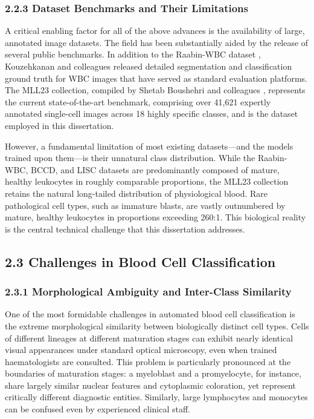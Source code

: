 \documentclass[11pt]{article}
\begin{document}
\subsubsection*{2.2.3 Dataset Benchmarks and Their Limitations}

A critical enabling factor for all of the above advances is the availability of large, annotated image datasets. The field has been substantially aided by the release of several public benchmarks. In addition to the Raabin-WBC dataset \cite{rahimzadeh2021}, Kouzehkanan and colleagues \cite{kouzehkanan2021} released detailed segmentation and classification ground truth for WBC images that have served as standard evaluation platforms. The MLL23 collection, compiled by Shetab Boushehri and colleagues \cite{mll23}, represents the current state-of-the-art benchmark, comprising over 41,621 expertly annotated single-cell images across 18 highly specific classes, and is the dataset employed in this dissertation.

However, a fundamental limitation of most existing datasets—and the models trained upon them—is their unnatural class distribution. While the Raabin-WBC, BCCD, and LISC datasets are predominantly composed of mature, healthy leukocytes in roughly comparable proportions, the MLL23 collection retains the natural long-tailed distribution of physiological blood. Rare pathological cell types, such as immature blasts, are vastly outnumbered by mature, healthy leukocytes in proportions exceeding 260:1. This biological reality is the central technical challenge that this dissertation addresses.

\subsection*{2.3 Challenges in Blood Cell Classification}

\subsubsection*{2.3.1 Morphological Ambiguity and Inter-Class Similarity}

One of the most formidable challenges in automated blood cell classification is the extreme morphological similarity between biologically distinct cell types. Cells of different lineages at different maturation stages can exhibit nearly identical visual appearances under standard optical microscopy, even when trained haematologists are consulted. This problem is particularly pronounced at the boundaries of maturation stages: a myeloblast and a promyelocyte, for instance, share largely similar nuclear features and cytoplasmic coloration, yet represent critically different diagnostic entities. Similarly, large lymphocytes and monocytes can be confused even by experienced clinical staff.
\end{document}
